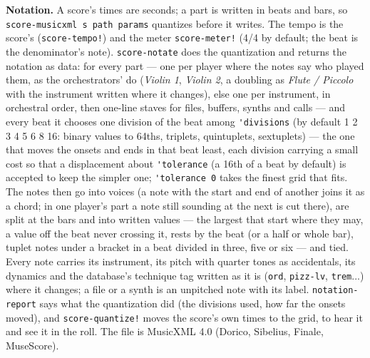 \documentclass[11pt,a4paper]{article}
\newcommand{\musil}[1]{\lstinline[style=musilinline]{#1}}
\begin{document}
\textbf{Notation.} A score's times are seconds; a part is written in beats and bars, so
\musil{score-musicxml s path params} quantizes before it writes. The tempo is the score's
(\musil{score-tempo!}) and the meter \musil{score-meter!} (4/4 by default; the beat is the
denominator's note). \musil{score-notate} does the quantization and returns the notation
as data: for every part --- one per player where the notes say who played them, as the
orchestrators' do (\emph{Violin 1}, \emph{Violin 2}, a doubling as \emph{Flute / Piccolo}
with the instrument written where it changes), else one per instrument, in orchestral
order, then one-line staves for files, buffers, synths and calls --- and every beat it
chooses one division of the beat among
\musil{'divisions} (by default 1 2 3 4 5 6 8 16: binary values to 64ths, triplets, quintuplets,
sextuplets) --- the one that moves the onsets and ends in that beat least, each division
carrying a small cost so that a displacement about \musil{'tolerance} (a 16th of a beat by
default) is accepted to keep the simpler one; \musil{'tolerance 0} takes the finest grid
that fits. The notes then go into voices (a note with the start and end of another joins
it as a chord; in one player's part a note still sounding at the next is cut there), are
split at the bars and into written values --- the largest that start
where they may, a value off the beat never crossing it, rests by the beat (or a half or
whole bar), tuplet notes under a bracket in a beat divided in three, five or six --- and
tied. Every note carries its instrument, its pitch with quarter tones as accidentals, its
dynamics and the database's technique tag written as it is (\texttt{ord}, \texttt{pizz-lv},
\texttt{trem}...) where it changes; a file or a synth is an unpitched note with its label.
\musil{notation-report} says what the quantization did (the divisions used, how far the
onsets moved), and \musil{score-quantize!} moves the score's own times to the grid, to hear
it and see it in the roll. The file is MusicXML 4.0 (Dorico, Sibelius, Finale, MuseScore).
\end{document}
